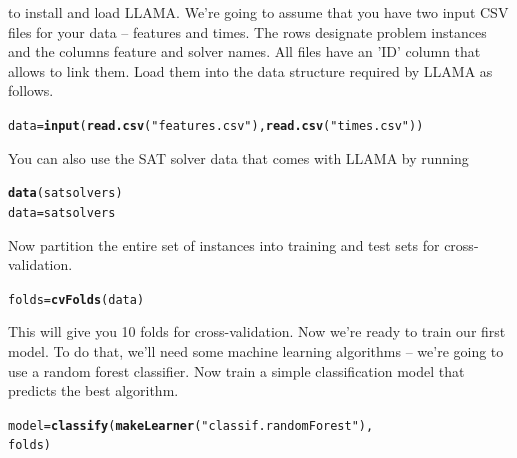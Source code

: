 \documentclass{article}\usepackage[]{graphicx}\usepackage[]{color}
\makeatletter
\newcommand{\hlstr}[1]{\textcolor[rgb]{0.192,0.494,0.8}{#1}}%
\newcommand{\hlstd}[1]{\textcolor[rgb]{0.345,0.345,0.345}{#1}}%
\newcommand{\hlkwb}[1]{\textcolor[rgb]{0.69,0.353,0.396}{#1}}%
\newcommand{\hlkwd}[1]{\textcolor[rgb]{0.737,0.353,0.396}{\textbf{#1}}}%
\newenvironment{kframe}{%
 \def\at@end@of@kframe{}%
 \ifinner\ifhmode%
  \def\at@end@of@kframe{\end{minipage}}%
  \begin{minipage}{\columnwidth}%
 \fi\fi%
 \def\FrameCommand##1{\hskip\@totalleftmargin \hskip-\fboxsep
 \colorbox{shadecolor}{##1}\hskip-\fboxsep
     \hskip-\linewidth \hskip-\@totalleftmargin \hskip\columnwidth}%
 \MakeFramed {\advance\hsize-\width
   \@totalleftmargin\z@ \linewidth\hsize
   \@setminipage}}%
 {\par\unskip\endMakeFramed%
 \at@end@of@kframe}
\newenvironment{knitrout}{}{} %
\makeatother
\begin{document}
to install and load LLAMA. We're going to assume that you have two input CSV
files for your data -- features and times. The rows designate problem instances
and the columns feature and solver names. All files have an 'ID' column that
allows to link them. Load them into the data structure required by LLAMA as
follows.

\begin{knitrout}
\color{fgcolor}\begin{kframe}
\begin{alltt}
\hlstd{data} \hlkwb{=} \hlkwd{input}\hlstd{(}\hlkwd{read.csv}\hlstd{(}\hlstr{"features.csv"}\hlstd{),} \hlkwd{read.csv}\hlstd{(}\hlstr{"times.csv"}\hlstd{))}
\end{alltt}
\end{kframe}
\end{knitrout}

You can also use the SAT solver data that comes with LLAMA by running

\begin{knitrout}
\color{fgcolor}\begin{kframe}
\begin{alltt}
\hlkwd{data}\hlstd{(satsolvers)}
\hlstd{data} \hlkwb{=} \hlstd{satsolvers}
\end{alltt}
\end{kframe}
\end{knitrout}

Now partition the entire set of instances into training and test sets for
cross-validation.

\begin{knitrout}
\color{fgcolor}\begin{kframe}
\begin{alltt}
\hlstd{folds} \hlkwb{=} \hlkwd{cvFolds}\hlstd{(data)}
\end{alltt}
\end{kframe}
\end{knitrout}

This will give you 10 folds for cross-validation. Now we're ready to train
our first model. To do that, we'll need some machine learning algorithms --
we're going to use a random forest classifier. Now train a simple classification
model that predicts the best algorithm.

\begin{knitrout}
\color{fgcolor}\begin{kframe}
\begin{alltt}
\hlstd{model} \hlkwb{=} \hlkwd{classify}\hlstd{(}\hlkwd{makeLearner}\hlstd{(}\hlstr{"classif.randomForest"}\hlstd{),}
    \hlstd{folds)}
\end{alltt}
\end{kframe}
\end{knitrout}
\end{document}

